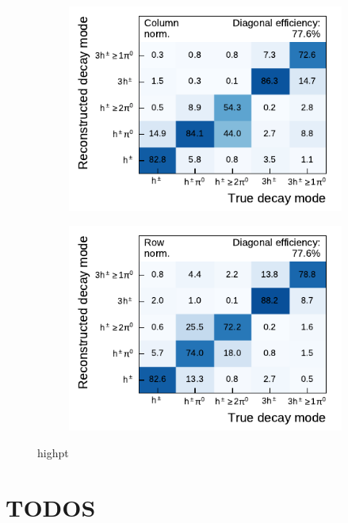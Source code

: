 \begin{figure}[htb]
\begin{subfigure}{0.48\textwidth}
  \end{subfigure}
  \begin{subfigure}{0.48\textwidth}
    \centering
    \includegraphics{./figures/decay_mode_classification/highpt/mig_mat_pt_geq_100.pdf}
  \end{subfigure}\hfill
  \begin{subfigure}{0.48\textwidth}
    \centering
    \includegraphics{./figures/decay_mode_classification/highpt/comp_mat_geq_100.pdf}
  \end{subfigure}
  \caption{highpt}
  \label{fig:highpt_matrices}
\end{figure}

\clearpage
\section{TODOS}
\listoftodos


